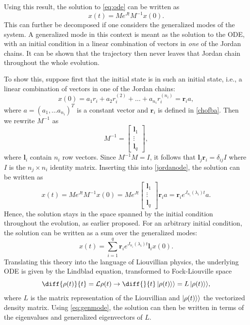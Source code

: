 \documentclass[../main.tex]{subfiles}
\begin{document}
Using this result, the solution to \cref{eq:ode} can be written as 
\begin{equation}\label{jordanode}
    x(t) = Me^{Jt}M^{-1}x(0).
\end{equation}
This can further be decomposed if one considers the generalized modes of the system. A generalized mode in this context is meant as the solution to the ODE, with an initial condition in a linear combination of vectors in \textit{one} of the Jordan chains. It can be shown that the trajectory then never leaves that Jordan chain throughout the whole evolution.

To show this, suppose first that the initial state is in such an initial state, i.e., a linear combination of vectors in one of the Jordan chains:
\begin{equation}
    x(0) = a_1r_i + a_2r_i^{(2)} + \dots + a_{n_i}r_i^{(n_i)} = \boldsymbol{r}_ia,
\end{equation}
where $a = (a_1, \dots a_{n_i})^T$ is a constant vector and $\boldsymbol{r}_i$ is defined in \cref{chofba}. Then we rewrite $M^{-1}$ as
\begin{equation}
    M^{-1} = \begin{bmatrix} \boldsymbol{l}_1 \\ \vdots \\ \boldsymbol{l}_{q} \end{bmatrix},\end{equation}
    where $\boldsymbol{l}_i$ contain $n_i$ row vectors. Since $M^{-1}M=I$, it follows that $\boldsymbol{l}_j \boldsymbol{r}_i = \delta_{ij}I$ where $I$ is the $n_j\times n_i$ identity matrix. Inserting this into \cref{jordanode}, the solution can be written as
\begin{equation}\label{eq:genmode}
    x(t) = Me^{Jt}M^{-1}x(0) = Me^{Jt} \begin{bmatrix} \boldsymbol{l}_1 \\ \vdots \\ \boldsymbol{l}_{q} \end{bmatrix} \boldsymbol{r}_ia = \boldsymbol{r}_i e^{J_{n_i}(\lambda_i)t} a.
\end{equation}
Hence, the solution stays in the space spanned by the initial condition throughout the evolution, as earlier proposed. For an arbitrary initial condition, the solution can be written as a sum over the generalized modes: 
\begin{equation}
    x(t) = \sum_{i=1}^q \boldsymbol{r}_i e^{J_{n_i}(\lambda_i)t} \boldsymbol{l}_i x(0).
\end{equation}
Translating this theory into the language of Liouvillian physics, the underlying ODE is given by the Lindblad equation, transformed to Fock-Liouville space    
\begin{equation}
    \diff{\rho(t)}{t}= \mathcal{L} \rho(t) \rightarrow \diff{}{t}\ket{\rho(t)}\rangle = L \ket{\rho(t)}\rangle,
\end{equation}
where $L$ is the matrix representation of the Liouvillian and $\ket{\rho(t)}\rangle$ the vectorized density matrix. Using \cref{eq:genmode}, the solution can then be written in terms of the eigenvalues and generalized eigenvectors of $L$.
\end{document}
